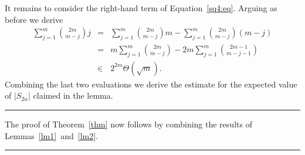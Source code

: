 \documentclass[12pt]{article}
\def\qed{\hfill\rule{2mm}{2mm}}
\begin{document}
It remains to consider the right-hand term of Equation~\ref{sq4:eq}.
Arguing as before we derive
\begin{eqnarray*}
\sum_{j=1}^{m} {{2m} \choose {m-j}} j 
& = &
\sum_{j=1}^{m} {{2m} \choose {m-j}} m -
\sum_{j=1}^{m} {{2m} \choose {m-j}} (m-j)   \\
& = &
m \sum_{j=1}^{m} {{2m} \choose {m-j}} -
2m \sum_{j=1}^{m} {{2m-1} \choose {m-j-1}}\\
& \in &
2^{2m} \Theta \left(  \sqrt{m} \right) .
\end{eqnarray*} 
Combining the last two evaluations 
we derive the estimate for the
expected value of $|S_{2n}|$ claimed 
in the lemma.
\qed

The proof of Theorem~\ref{thm} now follows by
combining the results of
Lemmas~\ref{lm1}~and~\ref{lm2}. \qed
\end{document}

